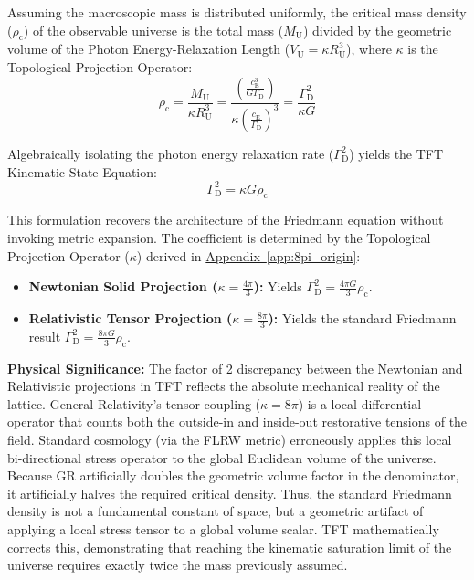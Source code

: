Assuming the macroscopic mass is distributed uniformly, the critical mass density ($\rho_{\mathrm{c}}$) of the observable universe is the total mass ($M_{\mathrm{U}}$) divided by the geometric volume of the Photon Energy-Relaxation Length ($V_{\mathrm{U}} = \kappa R_{\mathrm{U}}^3$), where $\kappa$ is the Topological Projection Operator:
\begin{equation}
    \rho_{\mathrm{c}} = \frac{M_{\mathrm{U}}}{\kappa R_{\mathrm{U}}^3} = \frac{\left( \frac{c_{\mathrm{E}}^3}{G \Gamma_{\mathrm{D}}} \right)}{\kappa \left( \frac{c_{\mathrm{E}}}{\Gamma_{\mathrm{D}}} \right)^3} = \frac{\Gamma_{\mathrm{D}}^2}{\kappa G}
\end{equation}

Algebraically isolating the photon energy relaxation rate ($\Gamma_{\mathrm{D}}^2$) yields the TFT Kinematic State Equation:
\begin{equation}
    \Gamma_{\mathrm{D}}^2 = \kappa G \rho_{\mathrm{c}}
\end{equation}

This formulation recovers the architecture of the Friedmann equation without invoking metric expansion. The coefficient is determined by the Topological Projection Operator ($\kappa$) derived in \hyperref[app:8pi_origin]{Appendix~\ref*{app:8pi_origin}}:
\begin{itemize}
    \item \textbf{Newtonian Solid Projection ($\kappa = \frac{4\pi}{3}$):} Yields $\Gamma_{\mathrm{D}}^2 = \frac{4\pi G}{3} \rho_{\mathrm{c}}$.
    \item \textbf{Relativistic Tensor Projection ($\kappa = \frac{8\pi}{3}$):} Yields the standard Friedmann result $\Gamma_{\mathrm{D}}^2 = \frac{8\pi G}{3} \rho_{\mathrm{c}}$.
\end{itemize}

\noindent\textbf{Physical Significance:} The factor of 2 discrepancy between the Newtonian and Relativistic projections in TFT reflects the absolute mechanical reality of the lattice. General Relativity’s tensor coupling ($\kappa = 8\pi$) is a local differential operator that counts both the outside-in and inside-out restorative tensions of the field. Standard cosmology (via the FLRW metric) erroneously applies this local bi-directional stress operator to the global Euclidean volume of the universe. Because GR artificially doubles the geometric volume factor in the denominator, it artificially halves the required critical density. Thus, the standard Friedmann density is not a fundamental constant of space, but a geometric artifact of applying a local stress tensor to a global volume scalar. TFT mathematically corrects this, demonstrating that reaching the kinematic saturation limit of the universe requires exactly twice the mass previously assumed.

